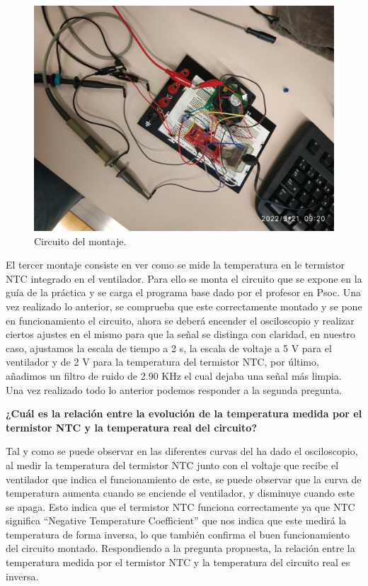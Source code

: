 \documentclass[11pt,a4paper]{article}
\begin{document}
\begin{figure}[h]
    \centering
    \includegraphics[scale=0.15]{images/IE_practica_3_sensor_temperatura.jpeg}
    \caption{Circuito del montaje.}
    \label{b}
\end{figure}

El tercer montaje consiste en ver como se mide la temperatura en le termistor NTC integrado en el ventilador. Para ello se monta el circuito que se expone en la guía de la práctica y se carga el programa base dado por el profesor en Psoc. Una vez realizado lo anterior, se comprueba que este correctamente montado y se pone en funcionamiento el circuito, ahora se deberá encender el osciloscopio y realizar ciertos ajustes en el mismo para que la señal se distinga con claridad, en nuestro caso, ajustamos la escala de tiempo a 2 s, la escala de voltaje a 5 V para el ventilador y de 2 V para la temperatura del termistor NTC, por último, añadimos un filtro de ruido de 2.90 KHz el cual dejaba una señal más limpia. Una vez realizado todo lo anterior podemos responder a la segunda pregunta.

\textbf{¿Cuál es la relación entre la evolución de la temperatura medida por el termistor NTC y la temperatura real del circuito?}

Tal y como se puede observar en las diferentes curvas del ha dado el osciloscopio, al medir la temperatura del termistor NTC junto con el voltaje que recibe el ventilador que indica el funcionamiento de este, se puede observar que la curva de temperatura aumenta cuando se enciende el ventilador, y disminuye cuando este se apaga. Esto indica que el termistor NTC funciona correctamente ya que NTC significa ``Negative Temperature Coefficient'' que nos indica que este medirá la temperatura de forma inversa, lo que también confirma el buen funcionamiento del circuito montado. Respondiendo a la pregunta propuesta, la relación entre la temperatura medida por el termistor NTC y la temperatura del circuito real es inversa.
\end{document}
